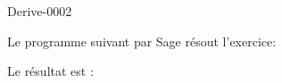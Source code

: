 
\begin{corrige}{Derive-0002}

Le programme suivant par Sage résout l'exercice:


Le résultat est :


\end{corrige}

